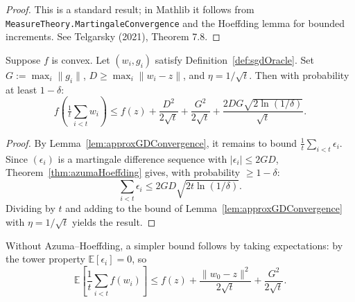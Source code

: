 \begin{proof}
  \leanok
This is a standard result; in Mathlib it follows from \texttt{MeasureTheory.MartingaleConvergence} and the Hoeffding lemma for bounded increments.
See Telgarsky (2021), Theorem 7.8.
\end{proof}

\begin{lemma}\label{lem:sgdHighProb}
Suppose $f$ is convex.
Let $(w_i, g_i)$ satisfy Definition~\ref{def:sgdOracle}.
Set $G := \max_i \|g_i\|$, $D \ge \max_i \|w_i - z\|$, and $\eta = 1/\sqrt{t}$.
Then with probability at least $1 - \delta$:
\[
  f\!\left(\tfrac{1}{t}\sum_{i<t} w_i\right) \le f(z)
    + \frac{D^2}{2\sqrt{t}} + \frac{G^2}{2\sqrt{t}} + \frac{2DG\sqrt{2\ln(1/\delta)}}{\sqrt{t}}.
\]
\end{lemma}

\begin{proof}
By Lemma~\ref{lem:approxGDConvergence}, it remains to bound $\frac{1}{t}\sum_{i<t}\epsilon_i$.
Since $(\epsilon_i)$ is a martingale difference sequence with $|\epsilon_i| \le 2GD$,
Theorem~\ref{thm:azumaHoeffding} gives, with probability $\ge 1 - \delta$:
\[
  \sum_{i<t}\epsilon_i \le 2GD\sqrt{2t\ln(1/\delta)}.
\]
Dividing by $t$ and adding to the bound of Lemma~\ref{lem:approxGDConvergence} with $\eta = 1/\sqrt{t}$ yields the result.
\end{proof}

\begin{remark}[In expectation]
Without Azuma--Hoeffding, a simpler bound follows by taking expectations: by the tower property $\mathbb{E}[\epsilon_i] = 0$, so
\[
  \mathbb{E}\!\left[\frac{1}{t}\sum_{i<t} f(w_i)\right]
  \le f(z) + \frac{\|w_0 - z\|^2}{2\sqrt{t}} + \frac{G^2}{2\sqrt{t}}.
\]
\end{remark}
